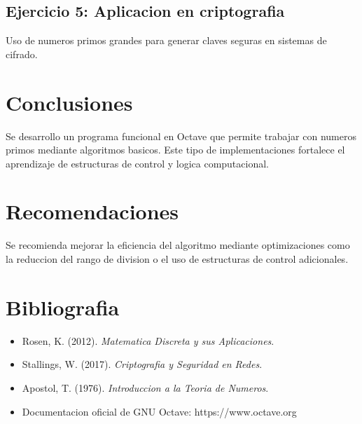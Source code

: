 \documentclass[12pt]{article}
\begin{document}
\subsection{Ejercicio 5: Aplicacion en criptografia}
Uso de numeros primos grandes para generar claves seguras en sistemas de cifrado.

\section{Conclusiones}

Se desarrollo un programa funcional en Octave que permite trabajar con numeros primos mediante algoritmos basicos. Este tipo de implementaciones fortalece el aprendizaje de estructuras de control y logica computacional.

\section{Recomendaciones}

Se recomienda mejorar la eficiencia del algoritmo mediante optimizaciones como la reduccion del rango de division o el uso de estructuras de control adicionales.

\section{Bibliografia}

\begin{itemize}
\item Rosen, K. (2012). \textit{Matematica Discreta y sus Aplicaciones}.
\item Stallings, W. (2017). \textit{Criptografia y Seguridad en Redes}.
\item Apostol, T. (1976). \textit{Introduccion a la Teoria de Numeros}.
\item Documentacion oficial de GNU Octave: https://www.octave.org
\end{itemize}
\end{document}
